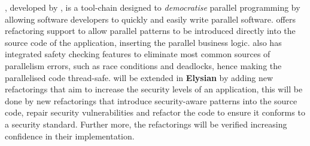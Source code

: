 \documentclass[a4paper,11pt]{article}
\newcommand{\project}[1]{\textbf{#1}\xspace}
\newcommand{\SECURITY}{\project{Elysian}}
\newcommand{\TheProject}{\SECURITY}
\begin{document}
\paraformance, developed by \SAshort{}, is a tool-chain designed to \emph{democratise} parallel programming by allowing software developers to quickly and easily write parallel software. %
\paraformance offers refactoring support to allow parallel patterns to be introduced directly into the source code of the application, inserting the parallel business logic. \paraformance also has integrated safety checking features to eliminate most common sources of parallelism errors, such as race conditions and deadlocks, hence making the parallelised code thread-safe. %
\paraformance will be extended in \TheProject{} by adding new refactorings that aim to increase the security levels of an application, this will be done by new refactorings that introduce security-aware patterns into the source code, repair security vulnerabilities and refactor the code to ensure it conforms to a security standard. Further more, the refactorings will be verified increasing confidence in their implementation.
%

\end{document}
